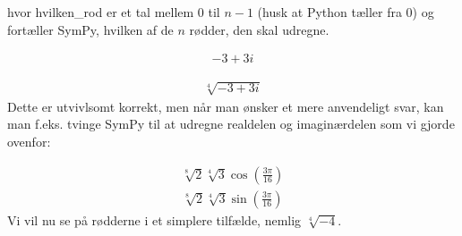 \documentclass[letterpaper,10pt,english]{jupyterBook}
\begin{document}
\begin{sphinxVerbatim}[commandchars=\\\{\}]
  
\end{sphinxVerbatim}

hvor hvilken\_rod er et tal mellem \(0\) til \(n-1\) (husk at Python tæller fra 0) og fortæller
SymPy, hvilken af de \(n\) rødder, den skal udregne.

\begin{sphinxVerbatim}[commandchars=\\\{\}]
       
\end{sphinxVerbatim}
\begin{equation*}
\begin{split}\displaystyle -3 + 3 i\end{split}
\end{equation*}
\begin{sphinxVerbatim}[commandchars=\\\{\}]
  
\end{sphinxVerbatim}
\begin{equation*}
\begin{split}\displaystyle \sqrt[4]{-3 + 3 i}\end{split}
\end{equation*}
Dette er utvivlsomt korrekt, men når man ønsker et mere anvendeligt svar, kan man f.eks. tvinge SymPy til at udregne real\sphinxhyphen{}delen og imaginærdelen som vi gjorde ovenfor:

\begin{sphinxVerbatim}[commandchars=\\\{\}]
    
\end{sphinxVerbatim}
\begin{equation*}
\begin{split}\displaystyle \sqrt[8]{2} \sqrt[4]{3} \cos{\left(\frac{3 \pi}{16} \right)}\end{split}
\end{equation*}\begin{equation*}
\begin{split}\displaystyle \sqrt[8]{2} \sqrt[4]{3} \sin{\left(\frac{3 \pi}{16} \right)}\end{split}
\end{equation*}
Vi vil nu se på rødderne i et simplere tilfælde, nemlig \(\sqrt[4]{-4}\).
\end{document}
